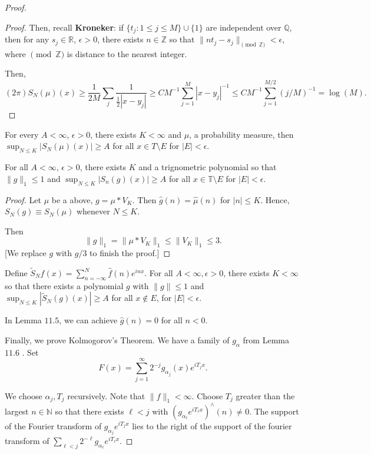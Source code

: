 \documentclass[11pt]{scrartcl}
\newcommand{\N}{\mathbb{N}}
\newcommand{\Z}{\mathbb{Z}}
\newcommand{\Q}{\mathbb{Q}}
\newcommand{\R}{\mathbb{R}}
\newcommand{\T}{\mathbb T}
\let \hat \widehat
\newcommand{\<}{\langle}
\renewcommand{\>}{\rangle}
\begin{document}
\begin{proof}
\begin{proof}
Then, recall \textbf{Kroneker}: if $\{t_j : 1 \le j \le M\} \cup \{1\}$ are independent over $\Q$, then for any $s_j \in \R$, $\epsilon> 0$, there exists $n \in \Z$ so that $\|nt_j - s_j\|_{\pmod{\Z}} < \epsilon$, where $\pmod{\Z}$ is distance to the nearest integer.

Then,
$$(2\pi) S_N(\mu)(x) \ge \frac{1}{2M}\sum_j \frac{1}{\frac{1}{2}|x-y_j|} \ge CM^{-1}\sum_{j=1}^M |x-y_j|^{-1} \le CM^{-1} \sum_{j=1}^{M/2}(j/M)^{-1} = \log(M).$$
\end{proof}
\begin{lemma} For every $A < \infty$, $\epsilon > 0$, there exists $K < \infty$ and $\mu$, a probability measure, then
$\sup_{N \le K} |S_N(\mu)(x)| \ge A$ for all $x \in T \setminus E$ for $|E| < \epsilon$.
\end{lemma}
\begin{lemma} For all $A< \infty$, $\epsilon > 0$, there exists $K$ and a trignometric polynomial so that $\|g\|_1 \le 1$ and $\sup_{N \le K} |S_n(g)(x)| \ge A$ for all $x \in \T\setminus E$ for $|E| < \epsilon$.
\end{lemma}
\begin{proof}
Let $\mu$ be a above, $g = \mu * V_K$.  Then $\hat{g}(n) = \hat{\mu}(n)$ for $|n| \le K$.  Hence, $S_N(g) \equiv S_N(\mu)$ whenever $N \le K$.

Then $$\|g\|_1 = \|\mu * V_K\|_1 \le \|V_K\|_1 \le 3.$$ [We replace $g$ with $g/3$ to finish the proof.]
\end{proof}

\begin{lemma} Define $\tilde S_N f(x) = \sum_{n = -\infty}^{N} \hat{f}(n) e^{inx}$.  For all $A < \infty, \epsilon > 0$, there exists $K < \infty$ so that there exists a polynomial $g$ with $\|g\| \le 1$ and $\sup_{N \le K} |\tilde{S}_N (g)(x)| \ge A$ for all $x \not \in E$, for $|E| < \epsilon$.
 \end{lemma}
 
 \begin{lemma} In Lemma $11.5$, we can achieve $\hat{g}(n) = 0$ for all $n < 0$.
 \end{lemma}
 
 Finally, we prove Kolmogorov's Theorem.  We have a family of $g_\alpha$ from Lemma $11.6$ .  Set $$F(x) = \sum_{j=1}^{\infty} 2^{-j}g_{\alpha_j}(x)e^{iT_j x}.$$
 
 We choose $\alpha_j, T_j$ recursively.  Note that $\|f\|_1 < \infty$.   Choose $T_j$ greater than the largest $n \in \N$ so that there exists $\ell < j$ with $(g_{\alpha_\ell}e^{iT_\ell x})^\wedge(n) \ne 0$.  The support of the Fourier transform of $g_{\alpha_j}e^{iT_j x}$ lies to the right of the support of the fourier transform of $\sum_{\ell < j} 2^{-\ell} g_{\alpha_\ell}e^{iT_\ell x}.$
 

\end{proof}
\end{document}
